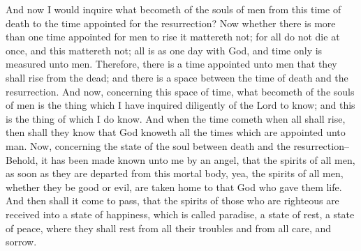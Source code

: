 And now I would inquire what becometh of the souls of men from this time of death to the time appointed for the resurrection?
\bverse \iffalse Now whether there is more than one time appointed for men to rise it mattereth not; for all do not die at once, and this mattereth not; all is as one day with God, and time only is measured unto men. \fi
Now whether there is more than one time appointed for men to rise it mattereth not; for all do not die at once, and this mattereth not; all is as one day with God, and time only is measured unto men.
\bverse \iffalse Therefore, there is a time appointed unto men that they shall rise from the dead; and there is a space between the time of death and the resurrection. And now, concerning this space of time, what becometh of the souls of men is the thing which I have inquired diligently of the Lord to know; and this is the thing of which I do know. \fi
Therefore, there is a time appointed unto men that they shall rise from the dead; and there is a space between the time of death and the resurrection. And now, concerning this space of time, what becometh of the souls of men is the thing which I have inquired diligently of the Lord to know; and this is the thing of which I do know.
\bverse \iffalse And when the time cometh when all shall rise, then shall they know that God knoweth all the times which are appointed unto man. \fi
And when the time cometh when all shall rise, then shall they know that God knoweth all the times which are appointed unto man.
\bverse \iffalse Now, concerning the state of the soul between death and the resurrection--Behold, it has been made known unto me by an angel, that the spirits of all men, as soon as they are departed from this mortal body, yea, the spirits of all men, whether they be good or evil, are taken home to that God who gave them life. \fi
Now, concerning the state of the soul between death and the resurrection--Behold, it has been made known unto me by an angel, that the spirits of all men, as soon as they are departed from this mortal body, yea, the spirits of all men, whether they be good or evil, are taken home to that God who gave them life.
\bverse \iffalse And then shall it come to pass, that the spirits of those who are righteous are received into a state of happiness, which is called paradise, a state of rest, a state of peace, where they shall rest from all their troubles and from all care, and sorrow. \fi
And then shall it come to pass, that the spirits of those who are righteous are received into a state of happiness, which is called paradise, a state of rest, a state of peace, where they shall rest from all their troubles and from all care, and sorrow.
